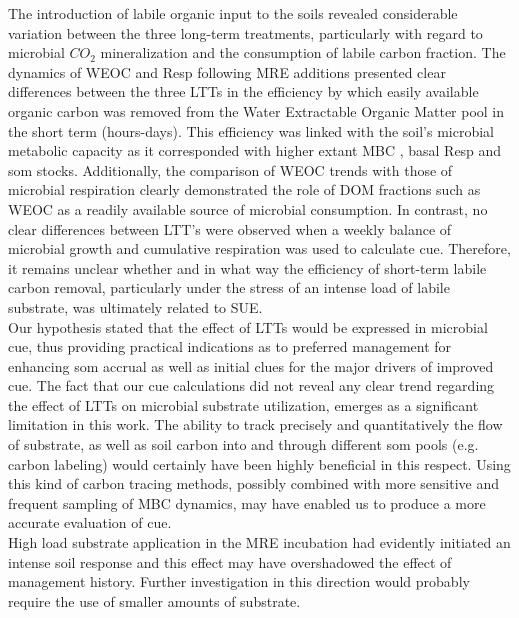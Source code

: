 The introduction of labile organic input to the soils revealed considerable variation between the three long-term treatments, particularly with regard to microbial $ CO_2 $ mineralization and the consumption of labile carbon fraction. The dynamics of WEOC and Resp following MRE additions presented clear differences between the three LTTs in the efficiency by which easily available organic carbon was removed from the Water Extractable Organic Matter pool in the short term (hours-days). This efficiency was linked with the soil's microbial metabolic capacity as it corresponded with higher extant MBC , basal Resp and \gls{som} stocks. Additionally, the comparison of WEOC trends with those of microbial respiration clearly demonstrated the role of DOM fractions such as WEOC as a readily available source of microbial consumption. In contrast, no clear differences between LTT's were observed when a weekly balance of microbial growth and cumulative respiration was used to calculate \gls{cue}. Therefore, it remains unclear whether and in what way the efficiency of short-term labile carbon removal, particularly under the stress of an intense load of labile substrate, was ultimately related to SUE.\\
Our hypothesis stated that the effect of LTTs would be expressed in microbial \gls{cue}, thus providing practical indications as to preferred management for enhancing \gls{som} accrual as well as initial clues for the major drivers of improved \gls{cue}. The fact that our \gls{cue} calculations did not reveal any clear trend regarding the effect of  LTTs on microbial substrate utilization, emerges as a significant limitation in this work. The ability to track precisely and quantitatively the flow of substrate, as well as soil carbon into and through different \gls{som} pools (e.g. carbon labeling) would certainly have been highly beneficial in this respect. Using this kind of carbon tracing methods, possibly combined with more sensitive and frequent sampling of MBC dynamics, may have enabled us to produce a more accurate evaluation of \gls{cue}.\\
High load substrate application in the MRE incubation had evidently initiated an intense soil response and this effect may have overshadowed the effect of management history. Further investigation in this direction would probably require the use of smaller amounts of substrate. \\

